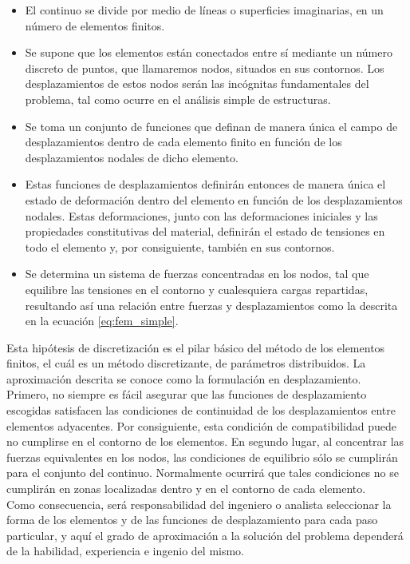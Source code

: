 \begin{itemize}
\item El continuo se divide por medio de líneas o superficies imaginarias, en un número 
de elementos finitos.
\item Se supone que los elementos están conectados entre sí mediante un número discreto de puntos, 
que llamaremos nodos, situados en sus contornos. Los desplazamientos de estos nodos serán las 
incógnitas fundamentales del problema, tal como ocurre en el análisis simple de estructuras.
\item Se toma un conjunto de funciones que definan de manera única el campo de desplazamientos 
dentro de cada elemento finito en función de los desplazamientos nodales de dicho elemento.
\item Estas funciones de desplazamientos definirán entonces de manera única el estado de 
deformación dentro del elemento en función de los desplazamientos nodales. Estas deformaciones, 
junto con las deformaciones iniciales y las propiedades constitutivas del material, definirán el 
estado de tensiones en todo el elemento y, por consiguiente, también en sus contornos.
\item Se determina un sistema de fuerzas concentradas en los nodos, tal que equilibre las tensiones 
en el contorno y cualesquiera cargas repartidas, resultando así una relación entre fuerzas y 
desplazamientos como la descrita en la ecuación \ref{eq:fem_simple}.
\end{itemize}

Esta hipótesis de discretización es el pilar básico del método de los elementos finitos, 
el cuál es un método discretizante, de parámetros distribuidos. La aproximación descrita 
se conoce como la formulación en desplazamiento. ~\cite{celigueta2011} \\

Primero, no siempre es fácil asegurar que las funciones de desplazamiento escogidas satisfacen las 
condiciones de continuidad de los desplazamientos entre elementos adyacentes. Por consiguiente, 
esta condición de compatibilidad puede no cumplirse en el contorno de los elementos. 
En segundo lugar, al concentrar las fuerzas equivalentes en los nodos, las condiciones de 
equilibrio sólo se cumplirán para el conjunto del continuo. Normalmente ocurrirá que tales 
condiciones no se cumplirán en zonas localizadas dentro y en el contorno de cada 
elemento. ~\cite{zienkiewicz2005} \\

Como consecuencia, será responsabilidad del ingeniero o analista  seleccionar la forma de 
los elementos y de las funciones de desplazamiento para cada paso particular, y aquí 
el grado de aproximación a la solución del problema dependerá de la habilidad, experiencia 
e ingenio del mismo.\\

